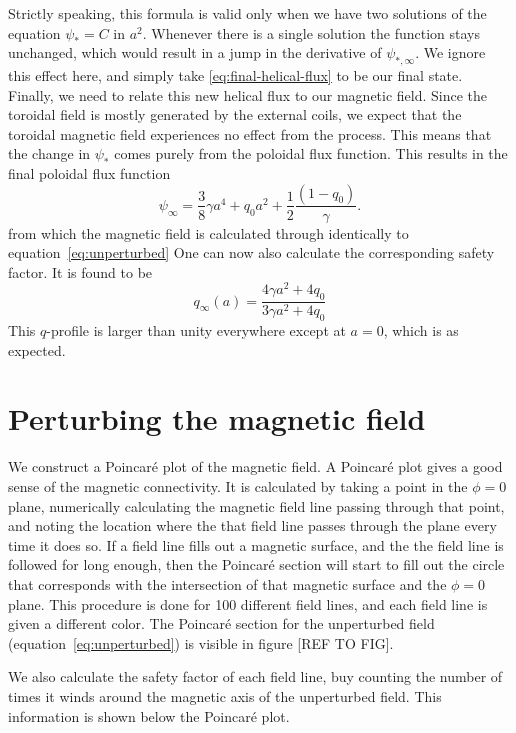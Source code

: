 \documentclass[%
superscriptaddress,
amsmath,amssymb,
aps,
pre,
floatfix,
]{revtex4-2}
\begin{document}
Strictly speaking, this formula is valid only when we have two solutions of the equation $\psi_* = C$ in $a^2$. Whenever there is a single solution the function stays unchanged, which would result in a jump in the derivative of $\psi_{*,\infty}$. We ignore this effect here, and simply take \eqref{eq:final-helical-flux} to be our final state. Finally, we need to relate this new helical flux to our magnetic field. Since the toroidal field is mostly generated by the external coils, we expect that the toroidal magnetic field experiences no effect from the process. This means that the change in $\psi_*$ comes purely from the poloidal flux function. This results in the final poloidal flux function
\begin{equation}
    \psi_\infty = \frac{3}{8} \gamma a^4 + q_0 a^2 + \frac{1}{2}  \frac{( 1 - q_0 )}{\gamma}.
\end{equation}
from which the magnetic field is calculated through identically to equation~\eqref{eq:unperturbed}
One can now also calculate the corresponding safety factor. It is found to be
\begin{equation}
    q_\infty(a) = \frac{4 \gamma a^2 + 4 q_0}{3 \gamma a^2 + 4 q_0}
\end{equation}
This $q$-profile is larger than unity everywhere except at $a=0$, which is as expected.


\section{Perturbing the magnetic field}
We construct a Poincar\'e plot of the magnetic field. 
A Poincar\'e plot gives a good sense of the magnetic connectivity. 
It is calculated by taking a point in the $\phi=0$ plane, numerically calculating the magnetic field line passing through that point, and noting the location where the that field line passes through the plane every time it does so. 
If a field line fills out a magnetic surface, and the the field line is followed for long enough, then the Poincar\'e section will start to fill out the circle that corresponds with the intersection of that magnetic surface and the $\phi=0$ plane. 
This procedure is done for 100 different field lines, and each field line is given a different color.
The Poincar\'e section for the unperturbed field (equation~\eqref{eq:unperturbed}) is visible in figure [REF TO FIG]. 

We also calculate the safety factor of each field line, buy counting the number of times it winds around the magnetic axis of the unperturbed field. 
This information is shown below the Poincar\'e plot. 
\end{document}
